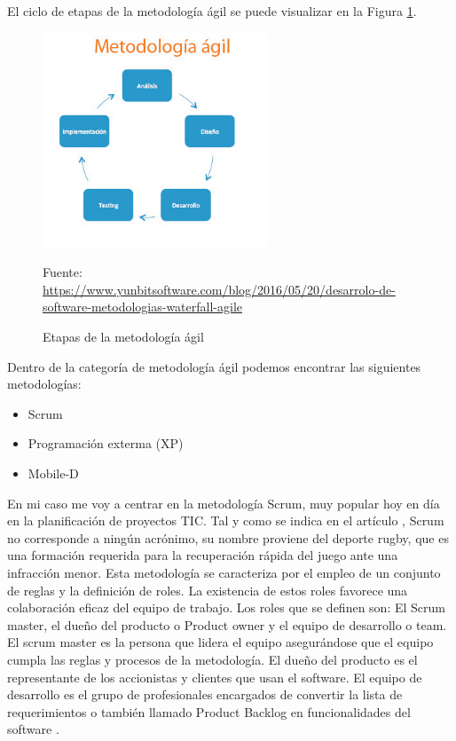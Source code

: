 El ciclo de etapas de la metodología ágil se puede visualizar en la Figura \ref{fig:etapas_agil}.

\begin{figure}[h]
    \centering
    \includegraphics[width=0.6\textwidth]{imagenes/03_Analisis/meto_agil.jpg}
    \label{fig:etapas_agil}
    \begin{center}
        Fuente: \url{https://www.yunbitsoftware.com/blog/2016/05/20/desarrolo-de-software-metodologias-waterfall-agile}
    \end{center}
    \caption{Etapas de la metodología ágil}
\end{figure}


Dentro de la categoría de metodología ágil podemos encontrar las siguientes metodologías:

\begin{itemize}
    \item Scrum
    \item Programación exterma (XP)
    \item Mobile-D
\end{itemize}

En mi caso me voy a centrar en la metodología Scrum, muy popular hoy en día en la planificación de proyectos TIC. Tal y como se indica en el artículo \cite{RefWorks:RefID:11-cevallos2018metodologias}, Scrum no corresponde a ningún acrónimo, su nombre proviene del deporte rugby, que es una formación requerida para la recuperación rápida del juego ante una infracción menor. Esta metodología se caracteriza por el empleo de un conjunto de reglas y la definición de roles. La existencia de estos roles favorece una colaboración eficaz del equipo de trabajo. 
Los roles que se definen son: El Scrum master, el dueño del producto o Product owner y el equipo de desarrollo o team. El scrum master es la persona que lidera el equipo asegurándose que el equipo cumpla las reglas y procesos de la metodología. El dueño del producto es el representante de los accionistas y clientes que usan el software. El equipo de desarrollo es el grupo de profesionales encargados de convertir la lista de requerimientos o también llamado Product Backlog en funcionalidades del software \cite{RefWorks:RefID:11-cevallos2018metodologias}.

